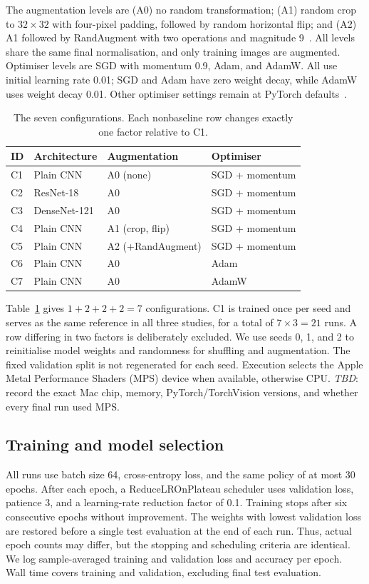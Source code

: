 \documentclass[conference,onecolumn]{IEEEtran}
\newcommand{\tbd}{\textit{TBD}}
\begin{document}
The augmentation levels are (A0) no random transformation; (A1) random
crop to $32\times32$ with four-pixel padding, followed by random horizontal
flip; and (A2) A1 followed by RandAugment with two operations and magnitude
9~\cite{randaugment}. All levels share the same final normalisation, and
only training images are augmented. Optimiser levels are SGD with momentum
0.9, Adam, and AdamW. All use initial learning rate 0.01; SGD and Adam have
zero weight decay, while AdamW uses weight decay 0.01. Other optimiser
settings remain at PyTorch defaults~\cite{pytorch}.

\begin{table}[htbp]
\caption{The seven configurations. Each nonbaseline row changes exactly one factor relative to C1.}
\label{tab:design}
\centering
\normalsize
\setlength{\tabcolsep}{8pt}
\begin{tabular}{@{}llll@{}}
\toprule
ID & Architecture & Augmentation & Optimiser \\
\midrule
C1 & Plain CNN & A0 (none) & SGD + momentum \\
C2 & ResNet-18 & A0 & SGD + momentum \\
C3 & DenseNet-121 & A0 & SGD + momentum \\
C4 & Plain CNN & A1 (crop, flip) & SGD + momentum \\
C5 & Plain CNN & A2 (+RandAugment) & SGD + momentum \\
C6 & Plain CNN & A0 & Adam \\
C7 & Plain CNN & A0 & AdamW \\
\bottomrule
\end{tabular}
\end{table}

Table~\ref{tab:design} gives $1+2+2+2=7$ configurations. C1 is trained
once per seed and serves as the same reference in all three studies, for a
total of $7\times3=21$ runs. A row differing in two factors is deliberately
excluded. We use seeds 0, 1, and 2 to reinitialise model weights and
randomness for shuffling and augmentation. The fixed validation split is
not regenerated for each seed. Execution selects the Apple Metal
Performance Shaders (MPS) device when available, otherwise CPU.
\tbd{}: record the exact Mac chip, memory, PyTorch/TorchVision versions,
and whether every final run used MPS.

\subsection{Training and model selection}
All runs use batch size 64, cross-entropy loss, and the same policy of at
most 30 epochs. After each epoch, a ReduceLROnPlateau scheduler uses
validation loss, patience 3, and a learning-rate reduction factor of 0.1.
Training stops after six consecutive epochs without
improvement. The weights with lowest validation loss are restored before
a single test evaluation at the end of each run. Thus, actual epoch counts
may differ, but the stopping and scheduling criteria are identical. We log
sample-averaged training and validation loss and accuracy per epoch. Wall
time covers training and validation, excluding final test evaluation.
\end{document}

